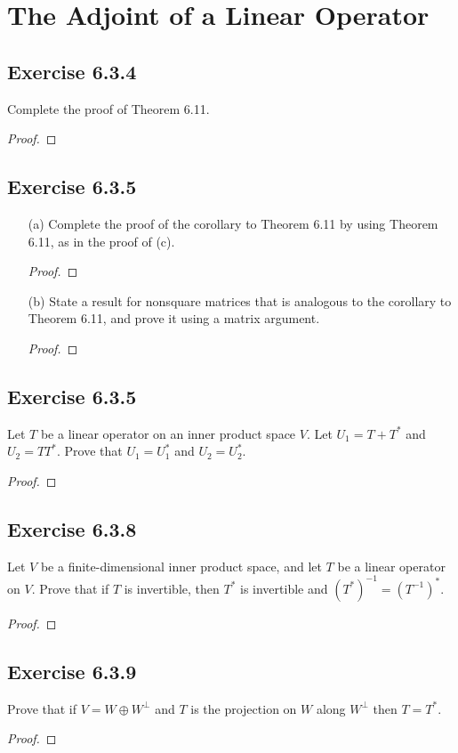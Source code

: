 \section{The Adjoint of a Linear Operator}

\subsection*{Exercise 6.3.4} Complete the proof of Theorem 6.11.
\begin{proof}

\end{proof}

\subsection*{Exercise 6.3.5} 
\begin{enumerate}
    \item[(a)] Complete the proof of the corollary to Theorem 6.11 by using Theorem 6.11, as in the proof of (c).
        \begin{proof}
        
        \end{proof}
    \item[(b)] State a result for nonsquare matrices that is analogous to the corollary to Theorem 6.11, and prove it using a matrix argument.
        \begin{proof}
        
        \end{proof}
\end{enumerate}

\subsection*{Exercise 6.3.5} Let \( T  \) be a linear operator on an inner product space \( V  \). Let \( {U}_{1} = T + T^{*} \) and \( {U}_{2} = TT^{*} \). Prove that \( {U}_{1} = {U}_{1}^{*} \) and \( {U}_{2} = {U}_{2}^{*} \).
\begin{proof}

\end{proof}

\subsection*{Exercise 6.3.8} Let \( V \) be a finite-dimensional inner product space, and let \( T  \) be a linear operator on \( V  \). Prove that if \( T  \) is invertible, then \( T^{*}  \) is invertible and \( (T^{*})^{-1} = (T^{-1})^{*} \).

\begin{proof}

\end{proof}

\subsection*{Exercise 6.3.9} Prove that if \( V = W \oplus W^{\perp} \) and \( T  \) is the projection on \( W  \) along \( W^{\perp} \) then \( T = T^{*} \).  
\begin{proof}

\end{proof}
